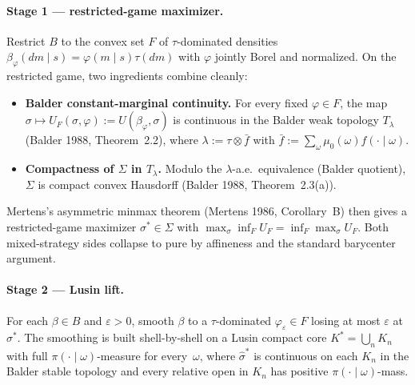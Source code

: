\documentclass[11pt]{article}
\theoremstyle{definition}
\theoremstyle{remark}
\newcommand{\eps}{\varepsilon}
\newcommand{\Si}{\Sigma}
\begin{document}
\paragraph{Stage 1 --- restricted-game maximizer.}
Restrict $B$ to the convex set $F$ of $\tau$-dominated densities
$\beta_\varphi(dm\mid s) = \varphi(m\mid s)\tau(dm)$ with
$\varphi$ jointly Borel and normalized. On the restricted game, two
ingredients combine cleanly:
\begin{itemize}[leftmargin=2em]
\item \textbf{Balder constant-marginal continuity.} For every fixed
$\varphi\in F$, the map $\sigma\mapsto U_F(\sigma,\varphi) :=
U(\beta_\varphi,\sigma)$ is continuous in the Balder weak topology
$T_\lambda$ (Balder 1988, Theorem~2.2), where $\lambda := \tau\otimes\bar f$
with $\bar f := \sum_\omega\mu_0(\omega)f(\cdot\mid\omega)$.
\item \textbf{Compactness of $\Si$ in $T_\lambda$.} Modulo the
$\lambda$-a.e.\ equivalence (Balder quotient), $\Si$ is compact convex
Hausdorff (Balder 1988, Theorem~2.3(a)).
\end{itemize}
Mertens's asymmetric minmax theorem (Mertens 1986, Corollary~B) then
gives a restricted-game maximizer $\sigma^*\in\Si$ with
$\max_\sigma\inf_F U_F = \inf_F\max_\sigma U_F$. Both mixed-strategy
sides collapse to pure by affineness and the standard barycenter
argument.

\paragraph{Stage 2 --- Lusin lift.}
For each $\beta\in B$ and $\eps>0$, smooth $\beta$ to a
$\tau$-dominated $\varphi_\eps\in F$ losing at most $\eps$ at
$\sigma^*$. The smoothing is built shell-by-shell on a Lusin compact
core $K^* = \bigcup_n K_n$ with full $\pi(\cdot\mid\omega)$-measure
for every~$\omega$, where $\hat\sigma^*$ is continuous on each $K_n$
in the Balder stable topology and every relative open in $K_n$ has
positive $\pi(\cdot\mid\omega)$-mass.
\end{document}
